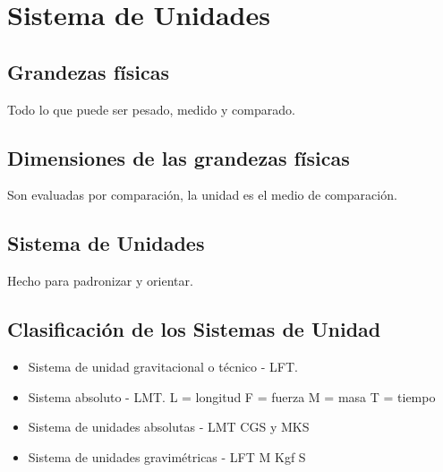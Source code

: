 \section{Sistema de Unidades}

	\subsection{Grandezas f\'isicas}
	Todo lo que puede ser pesado, medido y comparado.

	\subsection{Dimensiones de las grandezas f\'isicas}
	Son evaluadas por comparaci\'on, la unidad es el medio de comparaci\'on.

	\subsection{Sistema de Unidades}
	Hecho para padronizar y orientar.

	\subsection{Clasificaci\'on de los Sistemas de Unidad}
		\begin{itemize}
			\item	Sistema de unidad gravitacional o t\'ecnico - LFT.
			\item	Sistema absoluto - LMT.
				L = longitud
				F = fuerza
				M = masa
				T = tiempo
			\item	Sistema de unidades absolutas - LMT
				CGS y MKS
			\item	Sistema de unidades gravim\'etricas - LFT
				M
				Kgf
				S
		\end{itemize}
	
	
